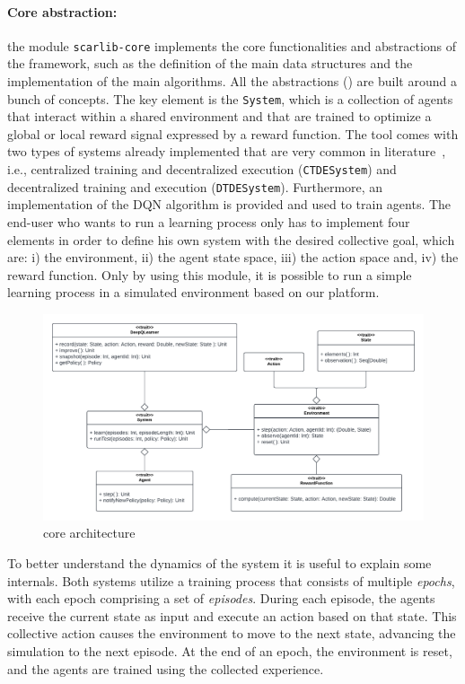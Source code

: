 \paragraph{Core abstraction:} the module \texttt{scarlib-core} implements the core functionalities and abstractions of the framework, such as the definition of the main data structures and the implementation of the main algorithms. 
%
All the abstractions () are built around a bunch of concepts. The key element is the \texttt{System}, which is a collection of agents that interact within a shared environment and that are trained to optimize a global or local reward signal
expressed by a reward function. 
%
The tool comes with two types of systems already implemented that are very common in literature~\cite{Du2020},
i.e., centralized training and decentralized execution (\texttt{CTDESystem}) and decentralized training and execution (\texttt{DTDESystem}).
Furthermore, an implementation of the DQN algorithm \cite{Mnih2015} is provided and used to train agents. 
The end-user who wants to run a learning process only has to implement four elements
in order to define his own system with the desired collective goal, which are: 
 i) the environment, 
 ii) the agent state space, 
 iii) the action space and,
 iv) the reward function.
Only by using this module, 
 it is possible to run a simple learning process in a simulated environment based on our platform.

\begin{figure}[t]
    \centering
    \includegraphics[width=\textwidth]{papers/coordination2023/imgs/core-architecture.pdf}
    \caption{\scarlib{} core architecture}
    \label{coordination2023:fig:arc}
\end{figure} %

To better understand the dynamics of the system it is useful to explain some internals.
%
Both systems utilize a training process that consists of multiple \emph{epochs}, 
 with each epoch comprising a set of \emph{episodes}. 
 During each episode, 
 the agents receive the current state as input and 
 execute an action based on that state. 
This collective action causes 
 the environment to move to the next state, 
 advancing the simulation to the next episode.
At the end of an epoch, 
 the environment is reset, and the agents are trained using the collected experience.

